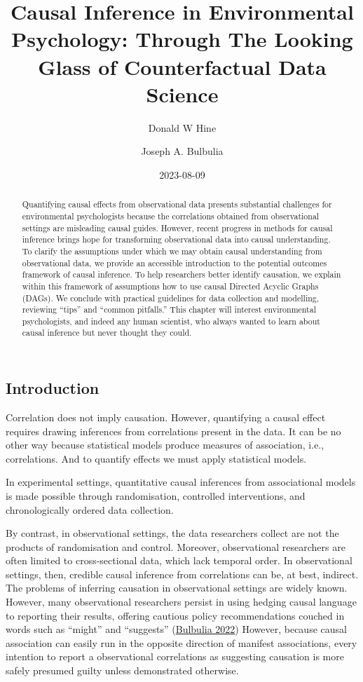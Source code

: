 \documentclass[
  singlecolumn]{article}
\title{Causal Inference in Environmental Psychology: Through The Looking
Glass of Counterfactual Data Science}
\author{Donald W Hine}
\affil{%
                  University of Canterbury, School of Psychology, Speech
                  and Hearing
              }
\author{Joseph A. Bulbulia}
\affil{%
                  Victoria University of Wellington, New Zealand, School
                  of Psychology, Centre for Applied Cross-Cultural
                  Research
              }
\date{2023-08-09}
\begin{document}
\maketitle
\begin{abstract}
Quantifying causal effects from observational data presents substantial
challenges for environmental psychologists because the correlations
obtained from observational settings are misleading causal guides.
However, recent progress in methods for causal inference brings hope for
transforming observational data into causal understanding. To clarify
the assumptions under which we may obtain causal understanding from
observational data, we provide an accessible introduction to the
potential outcomes framework of causal inference. To help researchers
better identify causation, we explain within this framework of
assumptions how to use causal Directed Acyclic Graphs (DAGs). We
conclude with practical guidelines for data collection and modelling,
reviewing ``tips'' and ``common pitfalls.'' This chapter will interest
environmental psychologists, and indeed any human scientist, who always
wanted to learn about causal inference but never thought they could.
\end{abstract}
\ifdefined\Shaded\renewenvironment{Shaded}{\begin{tcolorbox}[breakable, boxrule=0pt, borderline west={3pt}{0pt}{shadecolor}, interior hidden, enhanced, sharp corners, frame hidden]}{\end{tcolorbox}}\fi

\hypertarget{introduction}{%
\subsection{Introduction}\label{introduction}}

Correlation does not imply causation. However, quantifying a causal
effect requires drawing inferences from correlations present in the
data. It can be no other way because statistical models produce measures
of association, i.e., correlations. And to quantify effects we must
apply statistical models.

In experimental settings, quantitative causal inferences from
associational models is made possible through randomisation, controlled
interventions, and chronologically ordered data collection.

By contrast, in observational settings, the data researchers collect are
not the products of randomisation and control. Moreover, observational
researchers are often limited to cross-sectional data, which lack
temporal order. In observational settings, then, credible causal
inference from correlations can be, at best, indirect. The problems of
inferring causation in observational settings are widely known. However,
many observational researchers persist in using hedging causal language
to reporting their results, offering cautious policy recommendations
couched in words such as ``might'' and ``suggests''
(\protect\hyperlink{ref-bulbulia2022}{Bulbulia 2022}) However, because
causal association can easily run in the opposite direction of manifest
associations, every intention to report a observational correlations as
suggesting causation is more safely presumed guilty unless demonstrated
otherwise.
\end{document}
